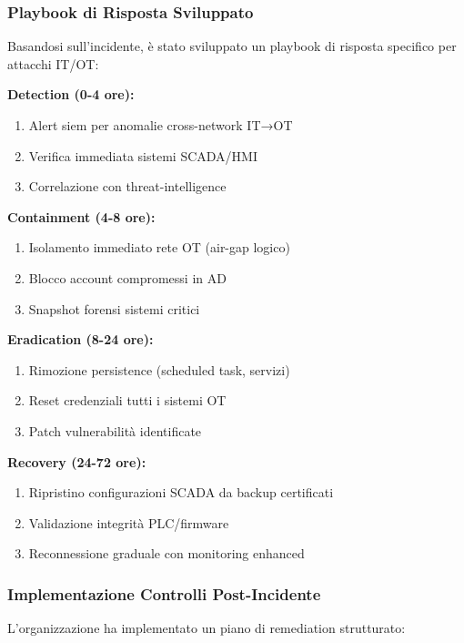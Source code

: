 \subsubsection{Playbook di Risposta Sviluppato}

Basandosi sull'incidente, è stato sviluppato un playbook di risposta specifico per attacchi IT/OT:

\textbf{Detection (0-4 ore):}
\begin{enumerate}
    \item Alert \gls{siem} per anomalie cross-network IT→OT
    \item Verifica immediata sistemi SCADA/HMI
    \item Correlazione con \gls{threat-intelligence}
\end{enumerate}

\textbf{Containment (4-8 ore):}
\begin{enumerate}
    \item Isolamento immediato rete OT (air-gap logico)
    \item Blocco account compromessi in AD
    \item Snapshot forensi sistemi critici
\end{enumerate}

\textbf{Eradication (8-24 ore):}
\begin{enumerate}
    \item Rimozione persistence (scheduled task, servizi)
    \item Reset credenziali tutti i sistemi OT
    \item Patch vulnerabilità identificate
\end{enumerate}

\textbf{Recovery (24-72 ore):}
\begin{enumerate}
    \item Ripristino configurazioni SCADA da backup certificati
    \item Validazione integrità PLC/firmware
    \item Reconnessione graduale con monitoring enhanced
\end{enumerate}

\subsubsection{Implementazione Controlli Post-Incidente}

L'organizzazione ha implementato un piano di remediation strutturato:

